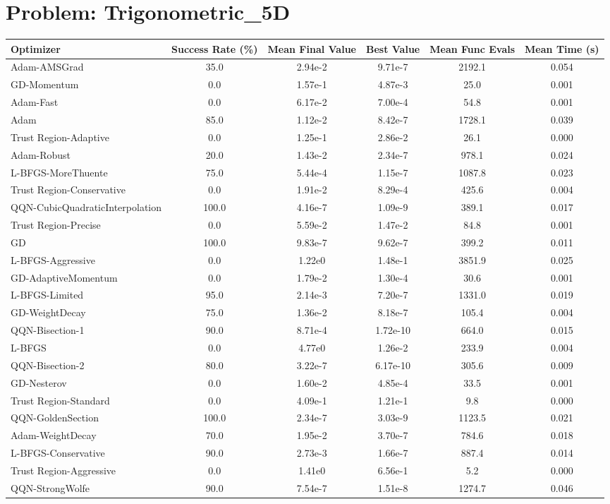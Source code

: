 \documentclass{article}
\begin{document}
\section{Problem: Trigonometric\_5D}
\begin{longtable}{p{3cm}*{5}{c}}
\toprule
\textbf{Optimizer} & \textbf{Success Rate (\%)} & \textbf{Mean Final Value} & \textbf{Best Value} & \textbf{Mean Func Evals} & \textbf{Mean Time (s)} \\
\midrule
Adam-AMSGrad & 35.0 & 2.94e-2 & 9.71e-7 & 2192.1 & 0.054 \\
GD-Momentum & 0.0 & 1.57e-1 & 4.87e-3 & 25.0 & 0.001 \\
Adam-Fast & 0.0 & 6.17e-2 & 7.00e-4 & 54.8 & 0.001 \\
Adam & 85.0 & 1.12e-2 & 8.42e-7 & 1728.1 & 0.039 \\
Trust Region-Adaptive & 0.0 & 1.25e-1 & 2.86e-2 & 26.1 & 0.000 \\
Adam-Robust & 20.0 & 1.43e-2 & 2.34e-7 & 978.1 & 0.024 \\
L-BFGS-MoreThuente & 75.0 & 5.44e-4 & 1.15e-7 & 1087.8 & 0.023 \\
Trust Region-Conservative & 0.0 & 1.91e-2 & 8.29e-4 & 425.6 & 0.004 \\
QQN-CubicQuadraticInterpolation & 100.0 & 4.16e-7 & 1.09e-9 & 389.1 & 0.017 \\
Trust Region-Precise & 0.0 & 5.59e-2 & 1.47e-2 & 84.8 & 0.001 \\
GD & 100.0 & 9.83e-7 & 9.62e-7 & 399.2 & 0.011 \\
L-BFGS-Aggressive & 0.0 & 1.22e0 & 1.48e-1 & 3851.9 & 0.025 \\
GD-AdaptiveMomentum & 0.0 & 1.79e-2 & 1.30e-4 & 30.6 & 0.001 \\
L-BFGS-Limited & 95.0 & 2.14e-3 & 7.20e-7 & 1331.0 & 0.019 \\
GD-WeightDecay & 75.0 & 1.36e-2 & 8.18e-7 & 105.4 & 0.004 \\
QQN-Bisection-1 & 90.0 & 8.71e-4 & 1.72e-10 & 664.0 & 0.015 \\
L-BFGS & 0.0 & 4.77e0 & 1.26e-2 & 233.9 & 0.004 \\
QQN-Bisection-2 & 80.0 & 3.22e-7 & 6.17e-10 & 305.6 & 0.009 \\
GD-Nesterov & 0.0 & 1.60e-2 & 4.85e-4 & 33.5 & 0.001 \\
Trust Region-Standard & 0.0 & 4.09e-1 & 1.21e-1 & 9.8 & 0.000 \\
QQN-GoldenSection & 100.0 & 2.34e-7 & 3.03e-9 & 1123.5 & 0.021 \\
Adam-WeightDecay & 70.0 & 1.95e-2 & 3.70e-7 & 784.6 & 0.018 \\
L-BFGS-Conservative & 90.0 & 2.73e-3 & 1.66e-7 & 887.4 & 0.014 \\
Trust Region-Aggressive & 0.0 & 1.41e0 & 6.56e-1 & 5.2 & 0.000 \\
QQN-StrongWolfe & 90.0 & 7.54e-7 & 1.51e-8 & 1274.7 & 0.046 \\
\bottomrule
\end{longtable}
\end{document}
